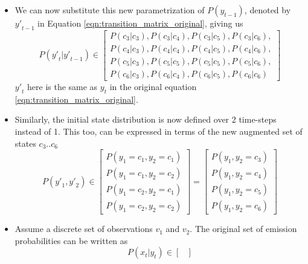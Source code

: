 \documentclass[parskip=half]{scrartcl}
\begin{document}
\begin{itemize}
            \item 
            We can now substitute this new parametrization of $P(y_{t-1})$, denoted by ${y\prime}_{t-1}$ in Equation \ref{eqn:transition_matrix_original}, giving us
            \begin{equation} \label{eqn:transition_matrix_new}
                P({y\prime}_t|{y\prime}_{t-1})
                \in 
                \begin{bmatrix}
                    P(c_3|c_3), P(c_3|c_4), P(c_3|c_5), P(c_3|c_6), \\
                    P(c_4|c_3), P(c_4|c_4), P(c_4|c_5), P(c_4|c_6), \\
                    P(c_5|c_3), P(c_5|c_5), P(c_5|c_5), P(c_5|c_6), \\
                    P(c_6|c_3), P(c_6|c_4), P(c_6|c_5), P(c_6|c_6)
                \end{bmatrix}
            \end{equation}
            ${y\prime}_t$ here is the same as $y_t$ in the original equation \ref{eqn:transition_matrix_original}.
            \item 
            Similarly, the initial state distribution is now defined over 2 time-steps instead of 1. This too, can be expressed in terms of the new augmented set of states $c_3 .. c_6$
            \begin{equation} \label{eqn:initial_state_dist_new}
                P({y\prime}_1, {y\prime}_2) \in \begin{bmatrix} P(y_1 = c_1, y_2 = c_1) \\ P(y_1 = c_1, y_2 = c_2) \\ P(y_1 = c_2, y_2 = c_1) \\ P(y_1 = c_2, y_2 = c_2) \end{bmatrix} = \begin{bmatrix} P(y_1,y_2 = c_3) \\ P(y_1,y_2 = c_4) \\ P(y_1,y_2 = c_5) \\ P(y_1,y_2 = c_6) \end{bmatrix}
            \end{equation}
            \item 
            Assume a discrete set of observations $v_1$ and $v_2$. The original set of emission probabilities can be written as
            \begin{equation}
                P(x_t | y_t) 
                \in 
                \begin{bmatrix}

\end{bmatrix}
\end{equation}
\end{itemize}
\end{document}
